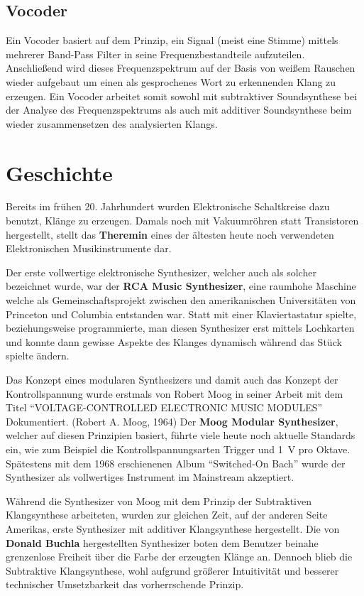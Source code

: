 \subsection{Vocoder}
\label{sec:org1ffbe28}
Ein Vocoder basiert auf dem Prinzip, ein Signal (meist eine Stimme) mittels mehrerer Band-Pass Filter in seine Frequenzbestandteile aufzuteilen. Anschließend wird dieses Frequenzspektrum auf der Basis von weißem Rauschen wieder aufgebaut um einen als gesprochenes Wort zu erkennenden Klang zu erzeugen. Ein Vocoder arbeitet somit sowohl mit subtraktiver Soundsynthese bei der Analyse des Frequenzspektrums als auch mit additiver Soundsynthese beim wieder zusammensetzen des analysierten Klangs.

\section{Geschichte}
\label{sec:org04df2b9}
Bereits im frühen 20. Jahrhundert wurden Elektronische Schaltkreise dazu benutzt, Klänge zu erzeugen. Damals noch mit Vakuumröhren statt Transistoren hergestellt, stellt das \textbf{Theremin} eines der ältesten heute noch verwendeten Elektronischen Musikinstrumente dar.

Der erste vollwertige elektronische Synthesizer, welcher auch als solcher bezeichnet wurde, war der \textbf{RCA Music Synthesizer}, eine raumhohe Maschine welche als Gemeinschaftsprojekt zwischen den amerikanischen Universitäten von Princeton und Columbia entstanden war. Statt mit einer Klaviertastatur spielte, beziehungsweise programmierte, man diesen Synthesizer erst mittels Lochkarten und konnte dann gewisse Aspekte des Klanges dynamisch während das Stück spielte ändern.

Das Konzept eines modularen Synthesizers und damit auch das Konzept der Kontrollspannung wurde erstmals von Robert Moog in seiner Arbeit mit dem Titel "`VOLTAGE-CONTROLLED ELECTRONIC MUSIC MODULES"' Dokumentiert. (Robert A. Moog, 1964) Der \textbf{Moog Modular Synthesizer}, welcher auf diesen Prinzipien basiert, führte viele heute noch aktuelle Standards ein, wie zum Beispiel die Kontrollspannungsarten Trigger und \SI{1}{\volt} pro Oktave. Spätestens mit dem 1968 erschienenen Album "`Switched-On Bach"' wurde der Synthesizer als vollwertiges Instrument im Mainstream akzeptiert.

Während die Synthesizer von Moog mit dem Prinzip der Subtraktiven Klangsynthese arbeiteten, wurden zur gleichen Zeit, auf der anderen Seite Amerikas, erste Synthesizer mit additiver Klangsynthese hergestellt. Die von \textbf{Donald Buchla} hergestellten Synthesizer boten dem Benutzer beinahe grenzenlose Freiheit über die Farbe der erzeugten Klänge an. Dennoch blieb die Subtraktive Klangsynthese, wohl aufgrund größerer Intuitivität und besserer technischer Umsetzbarkeit das vorherrschende Prinzip.

